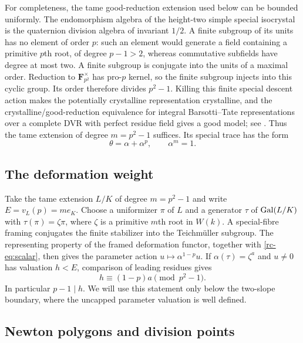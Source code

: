 For completeness, the tame good-reduction extension used below can be
bounded uniformly. The endomorphism algebra of the height-two simple
special isocrystal is the quaternion division algebra of invariant $1/2$.
A finite subgroup of its units has no element of order $p$: such an element
would generate a field containing a primitive $p$th root, of degree
$p-1>2$, whereas commutative subfields have degree at most two. A finite
subgroup is conjugate into the units of a maximal order. Reduction to
$\mathbf F_{p^2}^{\times}$ has pro-$p$ kernel, so the finite subgroup injects
into this cyclic group. Its order therefore divides $p^2-1$.
Killing this finite special descent action makes the potentially crystalline
representation crystalline, and the crystalline/good-reduction equivalence
for integral Barsotti--Tate representations over a complete DVR with
perfect residue field gives a good model; see
\citet[Theorem 2.2.1]{Liu2013}. Thus the tame extension of degree
$m=p^2-1$ suffices. Its special trace has the form
\begin{equation}\label{rc-eq:type}
 \theta=\alpha+\alpha^p,\qquad \alpha^m=1.
\end{equation}

\subsection{The deformation weight}

Take the tame extension $L/K$ of degree $m=p^2-1$ and write
$E=v_L(p)=me_K$. Choose a uniformizer $\pi$ of $L$ and a generator $\tau$
of $\operatorname{Gal}(L/K)$ with $\tau(\pi)=\zeta\pi$, where $\zeta$ is a primitive
$m$th root in $W(k)$. A special-fibre framing conjugates the finite stabilizer
into the Teichm\"uller subgroup. The representing property of the framed
deformation functor, together with \eqref{rc-eq:scalar}, then gives the
parameter action $u\mapsto\alpha^{1-p}u$.
If $\alpha(\tau)=\zeta^a$ and $u\ne0$ has valuation $h<E$, comparison of
leading residues gives
\begin{equation}\label{rc-eq:hasseweight}
 h\equiv(1-p)a\pmod{p^2-1}.
\end{equation}
In particular $p-1\mid h$. We will use this statement only below the
two-slope boundary, where the uncapped parameter valuation is well defined.

\subsection{Newton polygons and division points}

